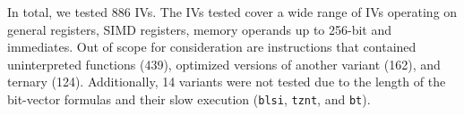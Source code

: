 



In total, we tested 886 IVs. 
The IVs tested cover a wide range of IVs operating on general registers, SIMD registers, memory operands up to 256-bit and immediates. 
Out of scope for consideration are instructions that contained uninterpreted functions (439), optimized versions of another variant (162), and ternary (124). 
Additionally, 14 variants were not tested due to the length of the bit-vector formulas and their slow execution (\texttt{blsi}, \texttt{tznt}, and \texttt{bt}).
\\







